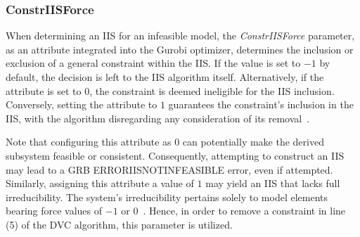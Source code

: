         \subsubsection{ConstrIISForce}
    
        When determining an IIS for an infeasible model, the \textit{ConstrIISForce} parameter, as an attribute integrated into the Gurobi optimizer, determines the inclusion or exclusion of a general constraint within the IIS. If the value is set to $-1$ by default, the decision is left to the IIS algorithm itself. Alternatively, if the attribute is set to $0$, the constraint is deemed ineligible for the IIS inclusion. Conversely, setting the attribute to $1$ guarantees the constraint's inclusion in the IIS, with the algorithm disregarding any consideration of its removal~\cite{gurobi}.
        
      
        Note that configuring this attribute as $0$ can potentially make the derived subsystem feasible or consistent. Consequently, attempting to construct an IIS may lead to a GRB \textunderscore ERROR\textunderscore IIS\textunderscore NOT\textunderscore INFEASIBLE error, even if attempted. Similarly, assigning this attribute a value of $1$ may yield an IIS that lacks full irreducibility. The system's irreducibility pertains solely to model elements bearing force values of $-1$ or $0$~\cite{gurobi}. Hence, in order to remove a constraint in line (5) of the DVC algorithm, this parameter is utilized.  
    

    
    
